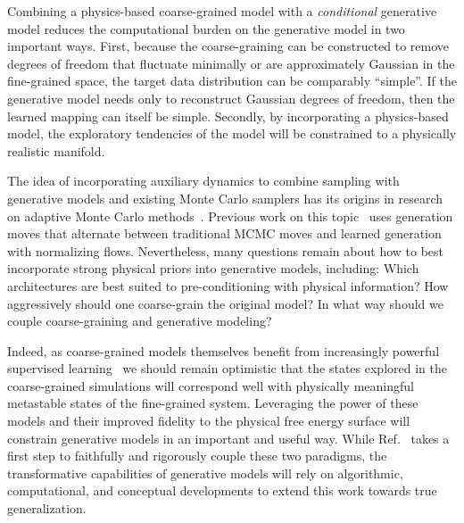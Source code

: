 \documentclass[11pt]{article}
\begin{document}
Combining a physics-based coarse-grained model with a \emph{conditional} generative model reduces the computational burden on the generative model in two important ways.
First, because the coarse-graining can be constructed to remove degrees of freedom that fluctuate minimally or are approximately Gaussian in the fine-grained space, the target data distribution can be comparably ``simple''. 
If the generative model needs only to reconstruct Gaussian degrees of freedom, then the learned mapping can itself be simple. 
Secondly, by incorporating a physics-based model, the exploratory tendencies of the model will be constrained to a physically realistic manifold. 

The idea of incorporating auxiliary dynamics to combine sampling with generative models and existing Monte Carlo samplers has its origins in research on adaptive Monte Carlo methods~\cite{del_moral_adaptive_2012}.
Previous work on this topic~\cite{gabrie_efficient_2021, gabrie_adaptive_2022} uses generation moves that alternate between traditional MCMC moves and learned generation with normalizing flows.
Nevertheless, many questions remain about how to best incorporate strong physical priors into generative models, including: Which architectures are best suited to pre-conditioning with physical information? How aggressively should one coarse-grain the original model? In what way should we couple coarse-graining and generative modeling?

Indeed, as coarse-grained models themselves benefit from increasingly powerful supervised learning~\cite{wang_machine_2019, husic_coarse_2020} we should remain optimistic that the states explored in the coarse-grained simulations will correspond well with physically meaningful metastable states of the fine-grained system. 
Leveraging the power of these models and their improved fidelity to the physical free energy surface will constrain generative models in an important and useful way. 
While Ref.~\cite{chennakesavalu_ensuring_2023} takes a first step to faithfully and rigorously couple these two paradigms, the transformative capabilities of generative models will rely on algorithmic, computational, and conceptual developments to extend this work towards true generalization. 


 

\end{document}
